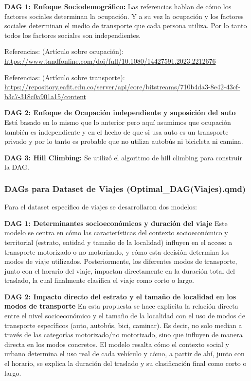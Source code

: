 \documentclass[12pt,a4paper]{article}
\begin{document}
\textbf{DAG 1: Enfoque Sociodemográfico:} Las referencias hablan de cómo los factores sociales determinan la ocupación. Y a su vez la ocupación y los factores sociales determinan el medio de transporte que cada persona utiliza. Por lo tanto todos los factores sociales son independientes.

Referencias: (Artículo sobre ocupación): \url{https://www.tandfonline.com/doi/full/10.1080/14427591.2023.2212676}

Referencias: (Artículo sobre transporte): \url{https://repository.eafit.edu.co/server/api/core/bitstreams/710b4da3-8e42-43cf-b3c7-318c0a901a15/content}

\textbf{DAG 2: Enfoque de Ocupación independiente y suposición del auto}
Está basado en lo mismo que lo anterior pero aquí asumimos que ocupación también es independiente y en el hecho de que si usa auto es un transporte privado y por lo tanto es probable que no utiliza autobús ni bicicleta ni camina.

\textbf{DAG 3: Hill Climbing:}
Se utilizó el algoritmo de hill climbing para construir la DAG.

\subsubsection{DAGs para Dataset de Viajes (Optimal\_DAG(Viajes).qmd)}

Para el dataset específico de viajes se desarrollaron dos modelos:

\textbf{DAG 1: Determinantes socioeconómicos y duración del viaje}
Este modelo se centra en cómo las características del contexto socioeconómico y territorial (estrato, entidad y tamaño de la localidad) influyen en el acceso a transporte motorizado o no motorizado, y cómo esta decisión determina los modos de viaje utilizados. Posteriormente, los diferentes modos de transporte, junto con el horario del viaje, impactan directamente en la duración total del traslado, la cual finalmente clasifica el viaje como corto o largo.

\textbf{DAG 2: Impacto directo del estrato y el tamaño de localidad en los modos de transporte}
En esta propuesta se hace explícita la relación directa entre el nivel socioeconómico y el tamaño de la localidad con el uso de modos de transporte específicos (auto, autobús, bici, caminar). Es decir, no solo median a través de las categorías motorizado/no motorizado, sino que influyen de manera directa en los modos concretos. El modelo resalta cómo el contexto social y urbano determina el uso real de cada vehículo y cómo, a partir de ahí, junto con el horario, se explica la duración del traslado y su clasificación final como corto o largo.
\end{document}
